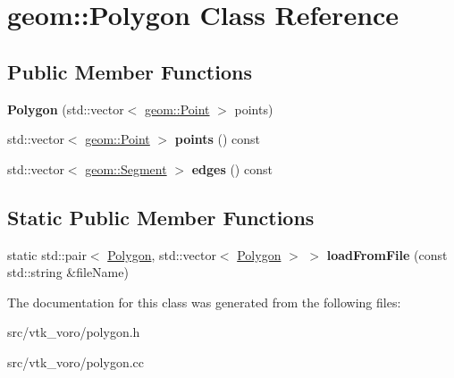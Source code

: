 \hypertarget{classgeom_1_1Polygon}{}\section{geom\+:\+:Polygon Class Reference}
\label{classgeom_1_1Polygon}
\subsection*{Public Member Functions}
\begin{DoxyCompactItemize}
\item 
{\bfseries Polygon} (std\+::vector$<$ \hyperlink{classgeom_1_1Point}{geom\+::\+Point} $>$ points)\hypertarget{classgeom_1_1Polygon_afaf512c8bdf41281be4f54e42e41a774}{}\label{classgeom_1_1Polygon_afaf512c8bdf41281be4f54e42e41a774}

\item 
std\+::vector$<$ \hyperlink{classgeom_1_1Point}{geom\+::\+Point} $>$ {\bfseries points} () const \hypertarget{classgeom_1_1Polygon_a755f9cdc530b4e37d106d0c6dd9a5a6c}{}\label{classgeom_1_1Polygon_a755f9cdc530b4e37d106d0c6dd9a5a6c}

\item 
std\+::vector$<$ \hyperlink{classgeom_1_1Segment}{geom\+::\+Segment} $>$ {\bfseries edges} () const \hypertarget{classgeom_1_1Polygon_a8b0ec94724da52c9806e7347521daa0f}{}\label{classgeom_1_1Polygon_a8b0ec94724da52c9806e7347521daa0f}

\end{DoxyCompactItemize}
\subsection*{Static Public Member Functions}
\begin{DoxyCompactItemize}
\item 
static std\+::pair$<$ \hyperlink{classgeom_1_1Polygon}{Polygon}, std\+::vector$<$ \hyperlink{classgeom_1_1Polygon}{Polygon} $>$ $>$ {\bfseries load\+From\+File} (const std\+::string \&file\+Name)\hypertarget{classgeom_1_1Polygon_a0e3744c4dffeb5ce4158f7fe98e99daf}{}\label{classgeom_1_1Polygon_a0e3744c4dffeb5ce4158f7fe98e99daf}

\end{DoxyCompactItemize}


The documentation for this class was generated from the following files\+:\begin{DoxyCompactItemize}
\item 
src/vtk\+\_\+voro/polygon.\+h\item 
src/vtk\+\_\+voro/polygon.\+cc\end{DoxyCompactItemize}
